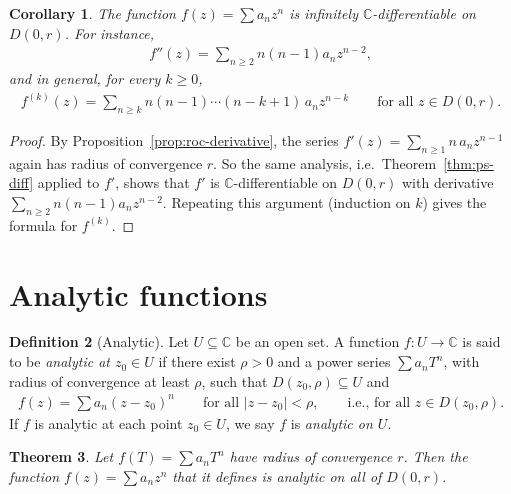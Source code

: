 \documentclass[11pt]{article}
\theoremstyle{plain}
\newtheorem{theorem}{Theorem}[section]
\newtheorem{corollary}[theorem]{Corollary}
\theoremstyle{definition}
\newtheorem{definition}[theorem]{Definition}
\theoremstyle{remark}
\numberwithin{equation}{section}
\newcommand{\be}{\begin{eqnarray}}
\newcommand{\ee}{\end{eqnarray}}
\newcommand{\C}{\mathbb{C}}
\begin{document}
\begin{corollary}
\label{cor:ps-smooth}
The function $f(z)=\sum a_nz^n$ is infinitely $\C$-differentiable on
$D(0,r)$. For instance,
\be
 f''(z)=\sum_{n\geq2}n(n-1)a_nz^{n-2},
\ee
and in general, for every $k\geq0$,
\be
 f^{(k)}(z)=\sum_{n\geq k}n(n-1)\cdots(n-k+1)\,a_nz^{n-k}
 \qquad\text{for all }z\in D(0,r).
\ee
\end{corollary}

\begin{proof}
By Proposition~\ref{prop:roc-derivative}, the series
$f'(z)=\sum_{n\geq1}n\,a_nz^{n-1}$ again has radius of convergence $r$. So
the same analysis, i.e.\ Theorem~\ref{thm:ps-diff} applied to $f'$, shows
that $f'$ is $\C$-differentiable on $D(0,r)$ with derivative
$\sum_{n\geq2}n(n-1)a_nz^{n-2}$. Repeating this argument (induction on $k$)
gives the formula for $f^{(k)}$.
\end{proof}

\section{Analytic functions}

\begin{definition}[Analytic]
\label{def:analytic}
Let $U\subseteq\C$ be an open set. A function $f\colon U\to\C$ is said to be
\emph{analytic at $z_0\in U$} if there exist $\rho>0$ and a power series
$\sum a_nT^n$, with radius of convergence at least $\rho$, such that
$D(z_0,\rho)\subseteq U$ and
\be
 f(z)=\sum a_n(z-z_0)^n\qquad\text{for all }|z-z_0|<\rho, \qquad \text{i.e.,  for all }  z\in D(z_0,\rho).
\ee
 If $f$ is analytic at each point $z_0\in U$,
we say $f$ is \emph{analytic on $U$}.
\end{definition}

\begin{theorem}
\label{thm:ps-analytic}
Let $f(T)=\sum a_nT^n$ have radius of convergence $r$. Then the function
$f(z)=\sum a_nz^n$ that it defines is analytic on all of $D(0,r)$.
\end{theorem}
\end{document}
